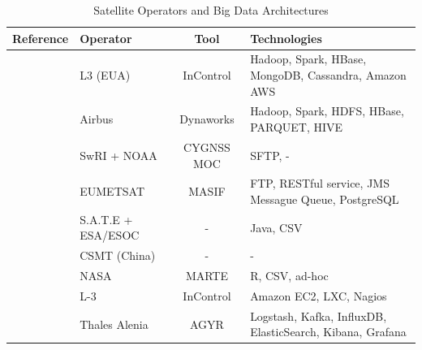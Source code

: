 \begin{table}[htbp]
  \begin{center}
    \caption{Satellite Operators and Big Data Architectures}\label{table:bigdataoperators}
    \begin{tabular}{|C{13em}|C{6em}|c|C{10em}|}
      \hline
      \bfseries Reference                           & \bfseries Operator & \bfseries Tool & \bfseries Technologies                                                                \\
      \hline
      \cite{adamskiDataAnalyticsLarge2016}           & L3 (EUA)           & InControl            & Hadoop, Spark, HBase, MongoDB, Cassandra, Amazon AWS                                 \\
      \hline
      \cite{boussoufBigDataBased2018}                & Airbus             & Dynaworks            & Hadoop, Spark, HDFS, HBase, PARQUET, HIVE                                            \\
      \hline
      \cite{dischnerCYGNSSMOCMeeting2016}            & SwRI + NOAA        & CYGNSS MOC           & SFTP, -                                                                              \\
      \hline
      \cite{edwardsDealingBigData2018}               & EUMETSAT           & MASIF                & FTP, RESTful service, JMS Messague Queue, PostgreSQL                                 \\
      \hline
      \cite{evansDataMiningDrastically2016}          & S.A.T.E + ESA/ESOC & -                    & Java, CSV                                                                            \\
      \hline
      \cite{fenManagementOperationCommunication2016} & CSMT (China)       & -                    & - \\
      \hline
      \cite{fernandezTelemetryAnomalyDetection2017}  & NASA               & MARTE                & R, CSV, ad-hoc                                                                       \\
      \hline
      \cite{gillesFlyingLargeConstellations2016}     & L-3                & InControl            & Amazon EC2, LXC, Nagios                                                              \\
      \hline
      \cite{hennionBigdataSatelliteYearly2018}       & Thales Alenia      & AGYR                 & Logstash, Kafka, InfluxDB, ElasticSearch, Kibana, Grafana                            \\

\end{tabular}
\end{center}
\end{table}
